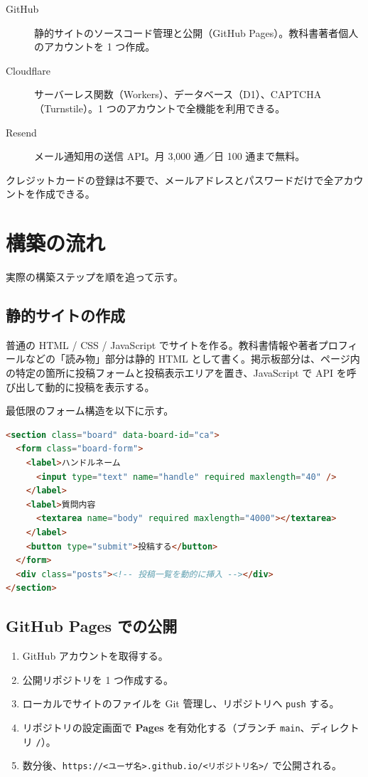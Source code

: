 \documentclass[11pt,a4paper,uplatex,dvipdfmx]{jsarticle}
\begin{document}
\begin{description}
\item[GitHub] 静的サイトのソースコード管理と公開（GitHub Pages）。教科書著者個人のアカウントを 1 つ作成。
\item[Cloudflare] サーバーレス関数（Workers）、データベース（D1）、CAPTCHA（Turnstile）。1 つのアカウントで全機能を利用できる。
\item[Resend] メール通知用の送信 API。月 3{,}000 通／日 100 通まで無料。
\end{description}

クレジットカードの登録は不要で、メールアドレスとパスワードだけで全アカウントを作成できる。

\section{構築の流れ}

実際の構築ステップを順を追って示す。

\subsection{静的サイトの作成}

普通の HTML / CSS / JavaScript でサイトを作る。教科書情報や著者プロフィールなどの「読み物」部分は静的 HTML として書く。掲示板部分は、ページ内の特定の箇所に投稿フォームと投稿表示エリアを置き、JavaScript で API を呼び出して動的に投稿を表示する。

最低限のフォーム構造を以下に示す。

\begin{lstlisting}[caption={掲示板フォームの最小構造},language=HTML]
<section class="board" data-board-id="ca">
  <form class="board-form">
    <label>ハンドルネーム
      <input type="text" name="handle" required maxlength="40" />
    </label>
    <label>質問内容
      <textarea name="body" required maxlength="4000"></textarea>
    </label>
    <button type="submit">投稿する</button>
  </form>
  <div class="posts"><!-- 投稿一覧を動的に挿入 --></div>
</section>
\end{lstlisting}

\subsection{GitHub Pages での公開}

\begin{enumerate}
\item GitHub アカウントを取得する。
\item 公開リポジトリを 1 つ作成する。
\item ローカルでサイトのファイルを Git 管理し、リポジトリへ \texttt{push} する。
\item リポジトリの設定画面で \textbf{Pages} を有効化する（ブランチ \texttt{main}、ディレクトリ \texttt{/}）。
\item 数分後、\texttt{https://<ユーザ名>.github.io/<リポジトリ名>/} で公開される。
\end{enumerate}
\end{document}
